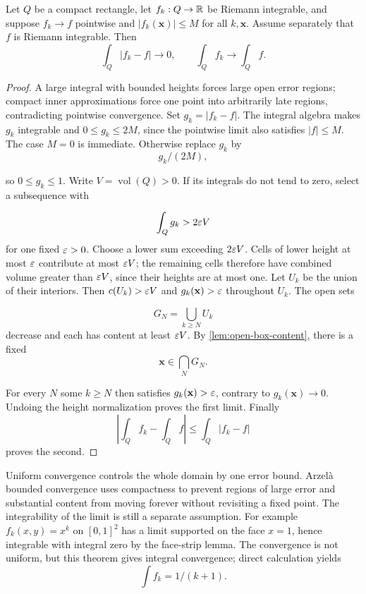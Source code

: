 \begin{theorem}\label{thm:multivariable-arzela-bounded}
Let $Q$ be a compact rectangle, let $f_k:Q\to\mathbb{R}$ be Riemann integrable,
and suppose $f_k\to f$ pointwise and $|f_k(\mathbf{x})|\leq M$ for all $k,\mathbf{x}$.
Assume separately that $f$ is Riemann integrable. Then
\[
\int_Q|f_k-f|\longrightarrow0,\qquad \int_Q f_k\longrightarrow\int_Q f.
\]
\end{theorem}
\begin{proof}
A large integral with bounded heights forces large open
error regions; compact inner approximations force one point into arbitrarily
late regions, contradicting pointwise convergence.
Set $g_k=|f_k-f|$. The integral algebra makes $g_k$ integrable and
$0\leq g_k\leq2M$, since the pointwise limit also satisfies $|f|\leq M$.
The case $M=0$ is immediate. Otherwise replace $g_k$ by
\[
g_k/(2M),
\]

so $0\leq g_k\leq1$. Write $V=\operatorname{vol}(Q)>0$.
If its integrals do not tend to zero, select a subsequence with

\[
\int_Qg_k>2\varepsilon V
\]
 for one fixed $\varepsilon>0$.
Choose a lower sum exceeding $2\varepsilon V$. Cells of lower height at most
$\varepsilon$ contribute at most $\varepsilon V$; the remaining cells therefore
have combined volume greater than $\varepsilon V$, since their heights are at most one.
Let $U_k$ be the union of their interiors. Then $c(U_k)>\varepsilon V$ and
$g_k(\mathbf{x})>\varepsilon$ throughout $U_k$. The open sets

\[
G_N=\bigcup_{k\geq N}U_k
\]
 decrease and each has content at least $\varepsilon V$.
By \cref{lem:open-box-content}, there is a fixed
\[
\mathbf{x}\in\bigcap_NG_N.
\]

For every $N$ some $k\geq N$ then satisfies $g_k(\mathbf{x})>\varepsilon$, contrary to
$g_k(\mathbf{x})\to0$. Undoing the height normalization proves the first limit.
Finally
\[
|\int_Q f_k-\int_Q f|\leq\int_Q|f_k-f|
\]
 proves the second.
\end{proof}
Uniform convergence controls the whole domain by one error bound.
Arzel\`a bounded convergence uses compactness to prevent regions of large
error and substantial content from moving forever without revisiting a
fixed point. The integrability of the limit is still a separate assumption.
For example $f_k(x,y)=x^k$ on $[0,1]^2$ has a limit supported on the face
$x=1$, hence integrable with integral zero by the face-strip lemma.
The convergence is not uniform, but this theorem gives integral convergence;
direct calculation yields
\[
\int f_k=1/(k+1).
\]




